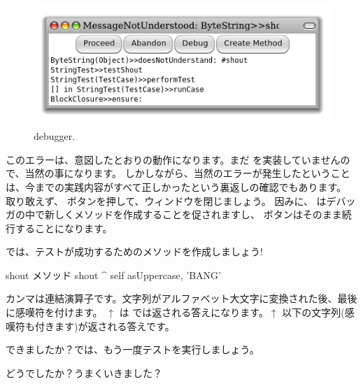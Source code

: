 \documentclass[a4paper,10pt,twoside]{book}
\begin{document}
\begin{figure}[hbt]
\centerline {\includegraphics[width=\textwidth]{Predebugger}}
\caption{debugger.}
\end{figure}

このエラーは、意図したとおりの動作になります。まだ  を実装していませんので、当然の事になります。
しかしながら、当然のエラーが発生したということは、今までの実践内容がすべて正しかったという裏返しの確認でもあります。
取り敢えず、 ボタンを押して、ウィンドウを閉じましょう。
因みに、 はデバッガの中で新しくメソッドを作成することを促されますし、 ボタンはそのまま続行することになります。

では、テストが成功するためのメソッドを作成しましょう!

\begin{method}[shout]{shout メソッド}
shout
	^ self asUppercase, 'BANG'
\end{method}

カンマは連結演算子です。文字列がアルファベット大文字に変換された後、最後に感嘆符を付けます。
$\uparrow$ は \pharo では返される答えになります。$\uparrow$ 以下の文字列(感嘆符も付きます)が返される答えです。

できましたか？では、もう一度テストを実行しましょう。

どうでしたか？うまくいきました？
\end{document}
